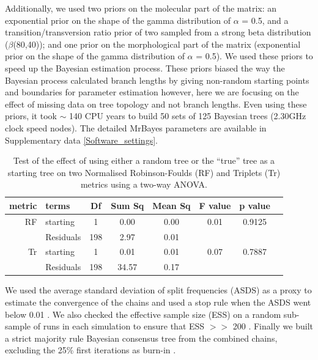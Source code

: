 Additionally, we used two priors on the molecular part of the matrix: an exponential prior on the shape of the gamma distribution of $\alpha$ = 0.5, and a transition/transversion ratio prior of two sampled from a strong beta distribution ($\beta$(80,40)); and one prior on the morphological part of the matrix (exponential prior on the shape of the gamma distribution of $\alpha$ = 0.5).
We used these priors to speed up the Bayesian estimation process.
These priors biased the way the Bayesian process calculated branch lengths by giving non-random starting points and boundaries for parameter estimation however, here we are focusing on the effect of missing data on tree topology and not branch lengths.
Even using these priors, it took $\sim$ 140 CPU years to build 50 sets of 125 Bayesian trees (2.30GHz clock speed nodes).
The detailed MrBayes parameters are available in Supplementary data \ref{Software_settings}.

\begin{table}[ht]
\caption[Effect of using the ``true'' tree as a starting tree]{Test of the effect of using either a random tree or the ``true'' tree as a starting tree on two Normalised Robinson-Foulds (RF) and Triplets (Tr) metrics using a two-way ANOVA.}
\label{Tab_lm_res}
\centering
\begin{tabular}{rlcccccc}
  \hline
 metric & terms & Df & Sum Sq & Mean Sq & F value & p value \\ 
  \hline
RF & starting    & 1 & 0.00 & 0.00 & 0.01 & 0.9125 \\ 
   & Residuals   & 198 & 2.97 & 0.01 &  &  \\ 
Tr & starting    & 1 & 0.01 & 0.01 & 0.07 & 0.7887 \\ 
   & Residuals   & 198 & 34.57 & 0.17 &  &  \\ 
   \hline
\end{tabular}
\end{table}

We used the average standard deviation of split frequencies (ASDS) as a proxy to estimate the convergence of the chains and used a stop rule when the ASDS went below 0.01 \citep{Ronquist2012mrbayes}.
We also checked the effective sample size (ESS) on a random sub-sample of runs in each simulation to ensure that ESS $>>$ 200 \citep{drummond2006ess}.
Finally we built a strict majority rule Bayesian consensus tree from the combined chains, excluding the 25\% first iterations as burn-in \citep{Ronquist2012mrbayes}.

